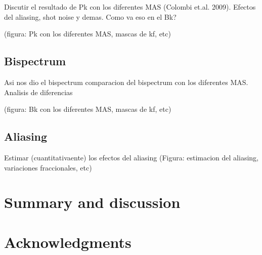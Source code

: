 \documentclass[useAMS,usenatbib]{mn2e}
\begin{document}
Discutir el resultado de Pk con los diferentes MAS (Colombi
et.al. 2009). Efectos del aliasing, shot noise y demas.
Como va eso en el Bk?

(figura: Pk con los diferentes MAS, mascas de kf, etc)

\subsection{Bispectrum}
\label{sec:results:bk}

Asi nos dio el bispectrum
comparacion del bispectrum con los diferentes MAS.
Analisis de diferencias

(figura: Bk con los diferentes MAS, mascas de kf, etc)

\subsection{Aliasing}
\label{sec:results:bk}

Estimar (cuantitativaente) los efectos del aliasing
(Figura: estimacion del aliasing, variaciones fraccionales, etc)


\section{Summary and discussion}



\section*{Acknowledgments}
\end{document}
